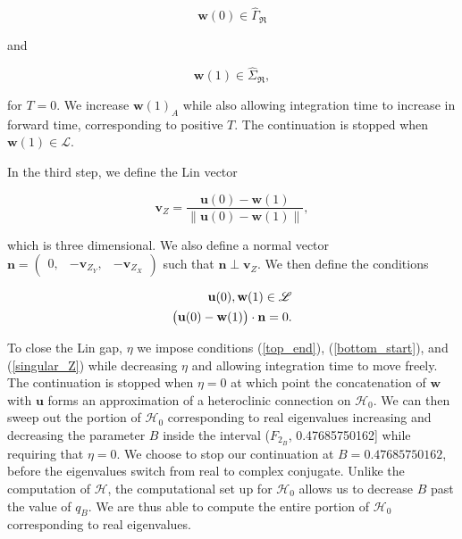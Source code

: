 \documentclass{ws-ijbc}
\begin{document}
\begin{equation}
	\mathbf{w}(0) \in \widehat{\Gamma}_{\Re}
	\label{bottom_start}
\end{equation}

and

\begin{equation}
	\mathbf{w}(1) \in \widehat{\Sigma}_{\Re},
\end{equation}

\noindent
for $T=0$.  We increase $\mathbf{w}(1)_A$ while also allowing integration time to increase in forward time, corresponding to positive $T$.  The continuation is stopped when $\mathbf{w}(1) \in \mathscr{L}$.

In the third step, we define the Lin vector 

\begin{equation}
	\mathbf{v}_Z = \frac{\mathbf{u}(0) - \mathbf{w}(1)}{\left\lVert \mathbf{u}(0) - \mathbf{w}(1) \right\lVert},
	\label{Lin_vector_singular}
\end{equation}

\noindent
which is three dimensional.  We also define a normal vector $\mathbf{n} = \begin{pmatrix} 0, & -\mathbf{v}_{Z_Y}, &-\mathbf{v}_{Z_X} \end{pmatrix}$ such that $\mathbf{n} \perp \mathbf{v}_Z$.  We then define the conditions 

\begin{align}
	\begin{split}
		\mathbf{u}(0), \mathbf{w}(1) \in \mathscr{L} \\ \vspace{2mm}
		\begin{pmatrix}\mathbf{u}(0) - \mathbf{w}(1)\end{pmatrix} \cdot \mathbf{n} =0.
	\end{split}
	\label{singular_Z}
\end{align}

\noindent
To close the Lin gap, $\eta$ we impose conditions (\ref{top_end}), (\ref{bottom_start}), and (\ref{singular_Z}) while decreasing $\eta$ and allowing integration time to move freely.  The continuation is stopped when $\eta = 0$ at which point the concatenation of $\mathbf{w}$ with $\mathbf{u}$ forms an approximation of a heteroclinic connection on $\mathscr{H}_0$.  We can then sweep out the portion of $\mathscr{H}_0$ corresponding to real eigenvalues increasing and decreasing the parameter $B$ inside the interval ($F_{2_B}$, 0.47685750162] while requiring that $\eta=0$.  We choose to stop our continuation at $B = 0.47685750162$, before the eigenvalues switch from real to complex conjugate.  Unlike the computation of $\mathscr{H}$, the computational set up for $\mathscr{H}_0$ allows us to decrease $B$ past the value of $q_B$.  We are thus able to compute the entire portion of $\mathscr{H}_0$ corresponding to real eigenvalues.
\end{document}
